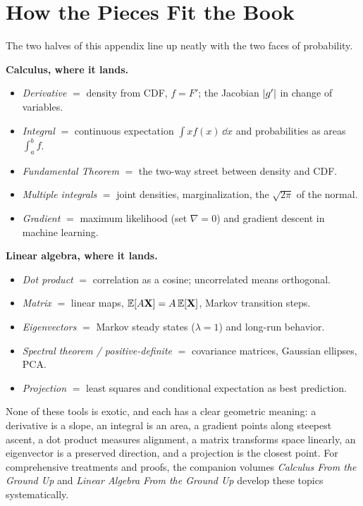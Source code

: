 \section{How the Pieces Fit the Book}
\label{chAcla:summary}

The two halves of this appendix line up neatly with the two faces of probability.

\begin{focusbox}
\textbf{Calculus, where it lands.}
\begin{itemize}
\item \emph{Derivative} $=$ density from CDF, $f=F'$; the Jacobian $\lvert g'\rvert$ in change of variables.
\item \emph{Integral} $=$ continuous expectation $\int x f(x)\,\dd x$ and probabilities as areas
  $\int_a^b f$.
\item \emph{Fundamental Theorem} $=$ the two-way street between density and CDF.
\item \emph{Multiple integrals} $=$ joint densities, marginalization, the $\sqrt{2\pi}$ of the normal.
\item \emph{Gradient} $=$ maximum likelihood (set $\nabla=0$) and gradient descent in machine learning.
\end{itemize}

\textbf{Linear algebra, where it lands.}
\begin{itemize}
\item \emph{Dot product} $=$ correlation as a cosine; uncorrelated means orthogonal.
\item \emph{Matrix} $=$ linear maps, $\operatorname{\mathbb{E}}[A\mathbf{X}]=A\operatorname{\mathbb{E}}[\mathbf{X}]$, Markov transition steps.
\item \emph{Eigenvectors} $=$ Markov steady states ($\lambda=1$) and long-run behavior.
\item \emph{Spectral theorem / positive-definite} $=$ covariance matrices, Gaussian ellipses, PCA.
\item \emph{Projection} $=$ least squares and conditional expectation as best prediction.
\end{itemize}
\end{focusbox}

None of these tools is exotic, and each has a clear geometric meaning: a derivative is a slope,
an integral is an area, a gradient points along steepest ascent, a dot product measures alignment, a matrix
transforms space linearly, an eigenvector is a preserved direction, and a projection is the closest point.
For comprehensive treatments and proofs, the companion volumes \emph{Calculus From the
Ground Up} and \emph{Linear Algebra From the Ground Up} develop these topics systematically.

